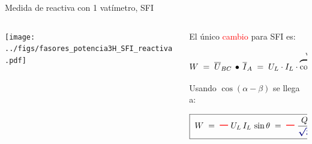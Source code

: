 \documentclass[aspectratio=169, usenames,svgnames,dvipsnames]{beamer}
\begin{document}
\begin{frame}{Medida de reactiva con 1 vatímetro, \hspace{3mm}SFI}
    \begin{columns}
    \begin{column}{0.5\columnwidth}

        \vspace{3mm}
        \texttt{[image: ../figs/fasores\_potencia3H\_SFI\_reactiva.pdf]}
    \end{column}
    \begin{column}{0.5\columnwidth}    
        El único \textcolor{red}{cambio} para \alert{SFI} es:

        \vspace{-7mm}
        \begin{equation*}
    	    W 
            \;=\; 
            \overline{U}_{BC}\,\bullet\,\overline{I}_A
            \;=\;
            U_L \cdot I_L \cdot \overbrace{\cos(90^\circ \color{red}{+} \, \color{black}{\theta)}}^{\text{ver gráfico}}
    	\end{equation*}

        \vspace{10mm}
        
        \hspace{3mm}Usando \href{https://raw.githubusercontent.com/ETSIDI-IE/tc/master/docs/diapos/TC1_Trigonometria_Complejos_LBB.pdf}{$\cos(\alpha-\beta)$} se llega a:
        
        \[
            \boxed{\; W
            \;=\, 
            {\Large\boldsymbol{\color{red} -}} \, U_L \, I_L \, \sin \theta 
            \;=\,
            {\Large\boldsymbol{\color{red} -}} \, \frac{Q}{\boldsymbol{\color{blue!50!black} \sqrt{3}}} \;}
        \]        
    \end{column}
    \end{columns}
\end{frame}

\end{document}
